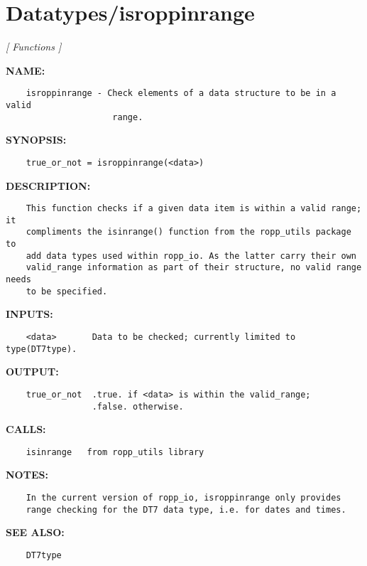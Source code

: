 \section{Datatypes/isroppinrange}
\textsl{[ Functions ]}

\label{ch:robo29}
\label{ch:Datatypes_isroppinrange}
\textbf{NAME:}\hspace{0.08in}\begin{Verbatim}
    isroppinrange - Check elements of a data structure to be in a valid
                     range.
\end{Verbatim}
\textbf{SYNOPSIS:}\hspace{0.08in}\begin{Verbatim}
    true_or_not = isroppinrange(<data>)
\end{Verbatim}
\textbf{DESCRIPTION:}\hspace{0.08in}\begin{Verbatim}
    This function checks if a given data item is within a valid range; it
    compliments the isinrange() function from the ropp_utils package to
    add data types used within ropp_io. As the latter carry their own
    valid_range information as part of their structure, no valid range needs
    to be specified.
\end{Verbatim}
\textbf{INPUTS:}\hspace{0.08in}\begin{Verbatim}
    <data>       Data to be checked; currently limited to type(DT7type).
\end{Verbatim}
\textbf{OUTPUT:}\hspace{0.08in}\begin{Verbatim}
    true_or_not  .true. if <data> is within the valid_range;
                 .false. otherwise.
\end{Verbatim}
\textbf{CALLS:}\hspace{0.08in}\begin{Verbatim}
    isinrange   from ropp_utils library
\end{Verbatim}
\textbf{NOTES:}\hspace{0.08in}\begin{Verbatim}
    In the current version of ropp_io, isroppinrange only provides
    range checking for the DT7 data type, i.e. for dates and times.
\end{Verbatim}
\textbf{SEE ALSO:}\hspace{0.08in}\begin{Verbatim}
    DT7type
\end{Verbatim}

